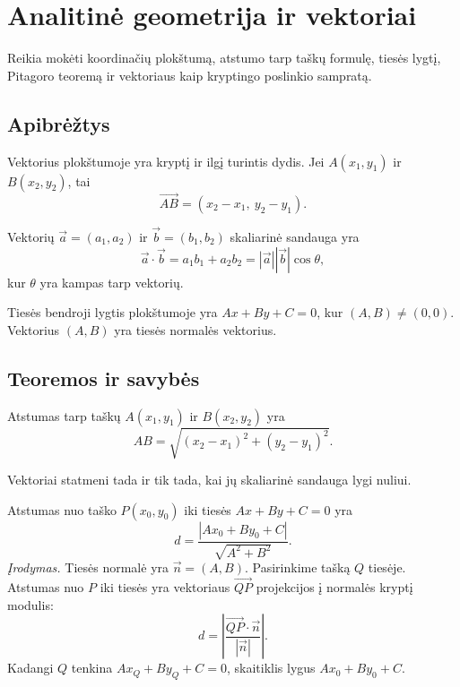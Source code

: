 \section{Analitinė geometrija ir vektoriai}\label{sec:analitine-geometrija-ir-vektoriai}

\begin{tcolorbox}[title=Prieš pradedant, colback=green!5]
Reikia mokėti koordinačių plokštumą, atstumo tarp taškų formulę, tiesės lygtį, Pitagoro teoremą ir vektoriaus kaip kryptingo poslinkio sampratą.
\end{tcolorbox}
\subsection{Apibrėžtys}

\begin{apibreztis}
Vektorius plokštumoje yra kryptį ir ilgį turintis dydis. Jei $A(x_1,y_1)$ ir $B(x_2,y_2)$, tai
\[
\overrightarrow{AB}=(x_2-x_1,\ y_2-y_1).
\]
\end{apibreztis}

\begin{apibreztis}
Vektorių $\vec a=(a_1,a_2)$ ir $\vec b=(b_1,b_2)$ skaliarinė sandauga yra
\[
\vec a\cdot \vec b=a_1b_1+a_2b_2=|\vec a||\vec b|\cos\theta,
\]
kur $\theta$ yra kampas tarp vektorių.
\end{apibreztis}

\begin{apibreztis}
Tiesės bendroji lygtis plokštumoje yra $Ax+By+C=0$, kur $(A,B)\ne(0,0)$. Vektorius $(A,B)$ yra tiesės normalės vektorius.
\end{apibreztis}

\subsection{Teoremos ir savybės}

\begin{savybe}
Atstumas tarp taškų $A(x_1,y_1)$ ir $B(x_2,y_2)$ yra
\[
AB=\sqrt{(x_2-x_1)^2+(y_2-y_1)^2}.
\]
\end{savybe}

\begin{savybe}
Vektoriai statmeni tada ir tik tada, kai jų skaliarinė sandauga lygi nuliui.
\end{savybe}

\begin{teorema}
Atstumas nuo taško $P(x_0,y_0)$ iki tiesės $Ax+By+C=0$ yra
\[
d=\frac{|Ax_0+By_0+C|}{\sqrt{A^2+B^2}}.
\]
\emph{Įrodymas.} Tiesės normalė yra $\vec n=(A,B)$. Pasirinkime tašką $Q$ tiesėje. Atstumas nuo $P$ iki tiesės yra vektoriaus $\overrightarrow{QP}$ projekcijos į normalės kryptį modulis:
\[
d=\left|\frac{\overrightarrow{QP}\cdot \vec n}{|\vec n|}\right|.
\]
Kadangi $Q$ tenkina $Ax_Q+By_Q+C=0$, skaitiklis lygus $Ax_0+By_0+C$.
\end{teorema}


